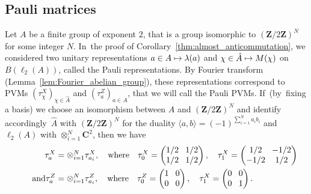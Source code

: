 \documentclass[JEP,XML,SOM,Unicode,published]{cedram}
\newcommand\mto{\mathchoice{\longmapsto}{\mapsto}{\mapsto}{\mapsto}}
\theoremstyle{plain}
\theoremstyle{definition}
\newcommand{\C}{\mathbf{C}}
\newcommand{\Z}{\mathbf{Z}}
\begin{document}
\subsection{Pauli matrices}\label{subsection:Pauli}
Let $A$ be a finite group of exponent $2$, that is a group isomorphic to $(\Z/2\Z)^N$ for some integer $N$. In~the proof of Corollary~\ref{thm:almost_anticommutation}, we considered two unitary representations $a \in A \mto \lambda(a)$ and $\chi \in \hat A \mto M(\chi)$ on $B(\ell_2(A))$, called the Pauli representations. By Fourier transform (Lemma~\ref{lem:Fourier_abelian_group}), these representations correspond to PVMs $(\tau^X_\chi)_{\chi \in \hat A}$ and $(\tau^Z_a)_{a \in A}$, that we will call the Pauli PVMs. If~(by~fixing a basis) we choose an isomorphism between $A$ and $(\Z/2\Z)^N$ and identify accordingly~$\hat A$ with $(\Z/2\Z)^N$ for the duality $\langle a ,b\rangle = (-1)^{\sum_{i=1}^N a_i b_i}$ and $\ell_2(A)$ with $\otimes_{i=1}^N \C^2$, then we have
\begin{align*}
\tau^X_a &= \otimes_{i=1}^N \tau^X_{a_i},\quad \text{where}\quad \arraycolsep4pt\tau^X_{0} = \begin{pmatrix} 1/2&1/2\\1/2&1/2
\end{pmatrix},\quad \tau^X_{1} = \begin{pmatrix} 1/2&-1/2\\-1/2&1/2
\end{pmatrix}\\
\tag*{and}
\tau^Z_a &= \otimes_{i=1}^N \tau^Z_{a_i},\quad \text{where}\quad \arraycolsep4pt\tau^Z_{0} = \begin{pmatrix} 1&0\\0&0
\end{pmatrix}, \quad \tau^X_{1} = \begin{pmatrix} 0&0\\0&1
\end{pmatrix}.
\end{align*}
\end{document}
